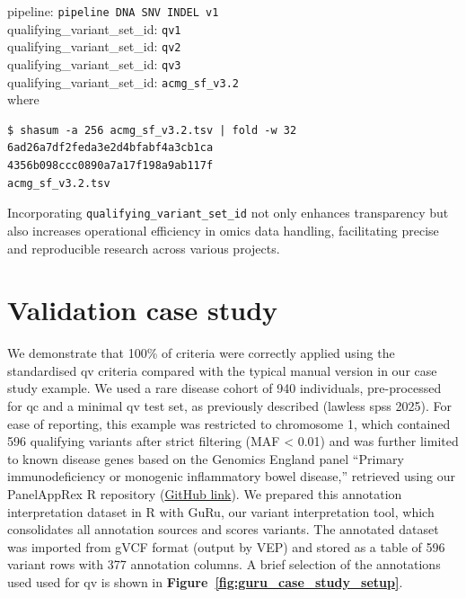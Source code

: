 \begin{tcolorbox}[
    colback=white!0,  %
    colframe=black,  %
    boxrule=1pt,  %
    arc=1mm,  %
    outer arc=1mm,
   title=\textbf{\refstepcounter{myboxcounter}\label{box:example_concept}Box \themyboxcounter: Example implementation}
]

pipeline: \colorbox{colorSUNSET1!30}{\texttt{pipeline DNA SNV INDEL v1}}\\
qualifying\_variant\_set\_id: \colorbox{colorSUNSET2!60}{\texttt{qv1}}\\
qualifying\_variant\_set\_id: \colorbox{colorSUNSET2!60}{\texttt{qv2}}\\
qualifying\_variant\_set\_id: \colorbox{colorSUNSET2!60}{\texttt{qv3}}\\
qualifying\_variant\_set\_id: \colorbox{colorSUNSET2!60}{\texttt{acmg\_sf\_v3.2}}\\

where 
\begin{verbatim}
$ shasum -a 256 acmg_sf_v3.2.tsv | fold -w 32
6ad26a7df2feda3e2d4bfabf4a3cb1ca
4356b098ccc0890a7a17f198a9ab117f
acmg_sf_v3.2.tsv
\end{verbatim}
\end{tcolorbox}

Incorporating \texttt{qualifying\_variant\_set\_id} not only enhances transparency but also increases operational efficiency in omics data handling, facilitating precise and reproducible research across various projects.

\section{Validation case study}

We demonstrate that 100\% of criteria were correctly applied using the standardised \ac{qv} criteria compared with the typical manual version in our case study example.
We used a rare disease cohort of 940 individuals, pre-processed for 
\ac{qc} and a minimal \ac{qv} test set, as previously described (lawless spss 2025). 
For ease of reporting, this example was restricted to chromosome 1, which contained 596 qualifying variants after strict filtering (MAF < 0.01) and was further limited to known disease genes based on the Genomics England panel ``Primary immunodeficiency or monogenic inflammatory bowel disease,'' retrieved using our PanelAppRex R repository (\href{https://github.com/DylanLawless/PanelAppRex}{GitHub link}). 
We prepared this annotation interpretation dataset in R with GuRu, our variant interpretation tool, which consolidates all annotation sources and scores variants. The annotated dataset was imported from gVCF format (output by VEP) and stored as a table of 596 variant rows with 377 annotation columns. A brief selection of the annotations used used for \ac{qv} is shown in \textbf{Figure~\ref{fig:guru_case_study_setup}}.

